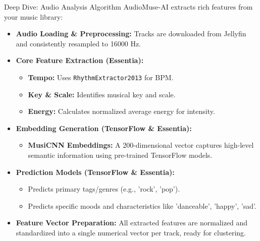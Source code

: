 \documentclass{beamer}
\begin{document}
\begin{frame}{Deep Dive: Audio Analysis Algorithm}
    AudioMuse-AI extracts rich features from your music library:
    \begin{itemize}
        \item \textbf{Audio Loading \& Preprocessing:} Tracks are downloaded from Jellyfin and consistently resampled to 16000 Hz.
        \item \textbf{Core Feature Extraction (Essentia):}
        \begin{itemize}
            \item \textbf{Tempo:} Uses \texttt{RhythmExtractor2013} for BPM.
            \item \textbf{Key \& Scale:} Identifies musical key and scale.
            \item \textbf{Energy:} Calculates normalized average energy for intensity.
        \end{itemize}
        \item \textbf{Embedding Generation (TensorFlow \& Essentia):}
        \begin{itemize}
            \item \textbf{MusiCNN Embeddings:} A 200-dimensional vector captures high-level semantic information using pre-trained TensorFlow models.
        \end{itemize}
        \item \textbf{Prediction Models (TensorFlow \& Essentia):}
        \begin{itemize}
            \item Predicts primary tags/genres (e.g., 'rock', 'pop').
            \item Predicts specific moods and characteristics like 'danceable', 'happy', 'sad'.
        \end{itemize}
        \item \textbf{Feature Vector Preparation:} All extracted features are normalized and standardized into a single numerical vector per track, ready for clustering.
    \end{itemize}
\end{frame}
\end{document}
